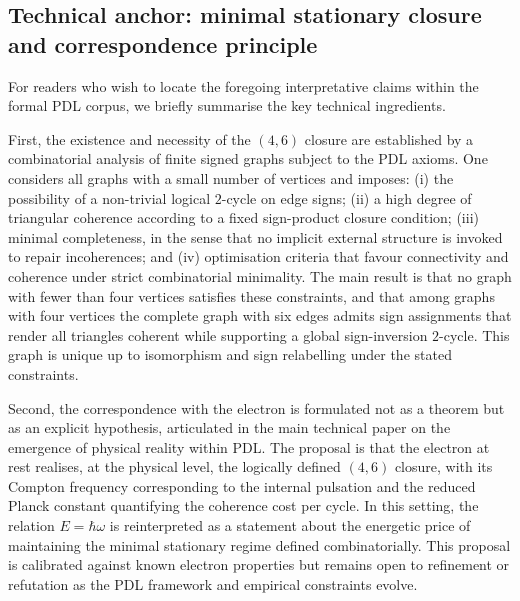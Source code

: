\documentclass[11pt,a4paper]{article}
\theoremstyle{definition}
\begin{document}
\subsection{Technical anchor: minimal stationary closure and correspondence principle}

For readers who wish to locate the foregoing interpretative claims within the formal PDL corpus, we briefly summarise the key technical ingredients.\cite{Laubscher_IntroPDL_2024,Laubscher_EmergencePhysicalReality_2024,Laubscher_MinimalClosures_46_2024,Laubscher_PDL_Position_2024}

First, the existence and necessity of the \((4,6)\) closure are established by a combinatorial analysis of finite signed graphs subject to the PDL axioms. One considers all graphs with a small number of vertices and imposes: (i) the possibility of a non-trivial logical \(2\)-cycle on edge signs; (ii) a high degree of triangular coherence according to a fixed sign-product closure condition; (iii) minimal completeness, in the sense that no implicit external structure is invoked to repair incoherences; and (iv) optimisation criteria that favour connectivity and coherence under strict combinatorial minimality.\cite{Laubscher_MinimalClosures_46_2024} The main result is that no graph with fewer than four vertices satisfies these constraints, and that among graphs with four vertices the complete graph with six edges admits sign assignments that render all triangles coherent while supporting a global sign-inversion \(2\)-cycle. This graph is unique up to isomorphism and sign relabelling under the stated constraints.\cite{Laubscher_MinimalClosures_46_2024}

Second, the correspondence with the electron is formulated not as a theorem but as an explicit hypothesis, articulated in the main technical paper on the emergence of physical reality within PDL.\cite{Laubscher_EmergencePhysicalReality_2024} The proposal is that the electron at rest realises, at the physical level, the logically defined \((4,6)\) closure, with its Compton frequency corresponding to the internal pulsation and the reduced Planck constant quantifying the coherence cost per cycle. In this setting, the relation \(E = \hbar \omega\) is reinterpreted as a statement about the energetic price of maintaining the minimal stationary regime defined combinatorially. This proposal is calibrated against known electron properties but remains open to refinement or refutation as the PDL framework and empirical constraints evolve.\cite{Laubscher_EmergencePhysicalReality_2024,Laubscher_PDL_Position_2024,Laubscher_PDL_GlobalMapping_v6_2024}
\end{document}
